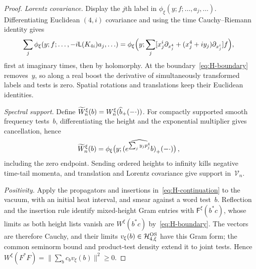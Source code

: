 \begin{proof}
\emph{Lorentz covariance.} Display the $j$th label in $\phi_\xi(y;f;\ldots,a_j,\ldots)$. Differentiating Euclidean $(4,i)$ covariance and using the time Cauchy--Riemann identity gives
\begin{equation*}
\sum_j\phi_\xi(y;f;\ldots,-i\mathsf L(K_{4i})a_j,\ldots)
=\phi_\xi\Bigl(y;\sum_j[x_j^i\partial_{x_j^4}+(x_j^4+iy_j)\partial_{x_j^i}]f\Bigr),
\end{equation*}
first at imaginary times, then by holomorphy. At the boundary~\eqref{eq:H-boundary} removes~$y$, so along a real boost the derivative of simultaneously transformed labels and tests is zero. Spatial rotations and translations keep their Euclidean identities.

\emph{Spectral support.} Define $\widetilde W_n^\xi(b)=W_n^\xi(\widehat{b}_{+}(-\cdot))$. For compactly supported smooth frequency tests~$b$, differentiating the height and the exponential multiplier gives cancellation, hence
\begin{equation}\label{eq:H-Laplace}
\widetilde W_n^\xi(b)=\phi_\xi\bigl(y;\widehat{(e^{\sum_jy_jp_j^4}b)}_{+}(-\cdot)\bigr)\,,
\end{equation}
including the zero endpoint. Sending ordered heights to infinity kills negative time-tail momenta, and translation and Lorentz covariance give support in~$\mathcal V_n$.

\emph{Positivity.} Apply the propagators and insertions in~\eqref{eq:H-continuation} to the vacuum, with an initial heat interval, and smear against a word test~$b$. Reflection and the insertion rule identify mixed-height Gram entries with $\mathsf F^\xi(b^*c)$, whose limits as both height lists vanish are $W^\xi(b^*c)$ by~\eqref{eq:H-boundary}. The vectors are therefore Cauchy, and their limits $v_\xi(b)\in\mathcal H_{4,\xi}^{\rm OS}$ have this Gram form; the common seminorm bound and product-test density extend it to joint tests. Hence $W^\xi(F^*F)=\|\sum_b c_bv_\xi(b)\|^2\ge0$.
\end{proof}


